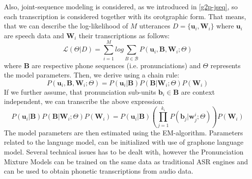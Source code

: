Also, joint-sequence modeling is considered, as we introduced in \ref{g2p-jseq}, so each transcription is considered together with its orotgraphic form.
That means, that we can describe the log-likelihood of $M$ utterances $ D = \{\mathbf{u}_i,\mathbf{W}_i\}$ where $\mathbf{u}_i$ are speech data and $\mathbf{W}_i$ their transcriptions as follows:
\begin{equation}
\mathcal{L}(\Theta\vert D) = \sum_{i=1}^M log \sum_{B \in \mathcal{B}} P(\mathbf{u}_i,\mathbf{B},\mathbf{W}_i;\Theta)
\end{equation}
where $\mathbf{B}$ are respective phone sequences (i.e. pronunciations) and $\Theta$ represents the model parameters.
Then, we derive using a chain rule:
\begin{equation}
P(\mathbf{u}_i,\mathbf{B},\mathbf{W}_i;\Theta) =  P(\mathbf{u}_i\vert\mathbf{B})P(\mathbf{B}\vert\mathbf{W}_i;\Theta)P(\mathbf{W}_i)
\end{equation}
If we further assume, that pronunciation sub-units $\mathbf{b}_i \in \mathbf{B}$ are context independent, we can transcribe the above expression:
\begin{equation}
P(\mathbf{u}_i\vert\mathbf{B})P(\mathbf{B}\vert\mathbf{W}_i;\Theta)P(\mathbf{W}_i) = P(\mathbf{u}_i\vert\mathbf{B})(\prod_{j=1}^{k_i}P(\mathbf{b}_j\vert \mathbf{w}^i_j;\Theta))P(\mathbf{W}_i) 
\end{equation}
The model parameters are then estimated using the EM-algorithm.
Parameters related to the language model, can be initialized with use of graphone language model.
Several technical issues has to be dealt with, however the Pronunciation Mixture Models can be trained on the same data as traditional ASR engines and can be used to obtain phonetic transcriptions from audio data.
\linebreak\linebreak

